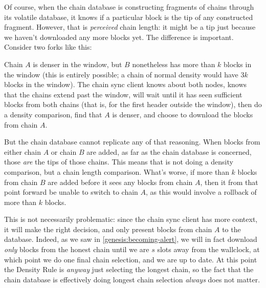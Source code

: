 Of course, when the chain database is constructing fragments of chains through
its volatile database, it knows if a particular block is the tip of any
constructed fragment. However, that is \emph{perceived} chain length: it might
be a tip just because we haven't downloaded any more blocks yet. The difference
is important. Consider two forks like this:
%
\begin{center}
\end{center}
%
Chain $A$ is denser in the window, but $B$ nonetheless has more than $k$ blocks
in the window (this is entirely possible; a chain of normal density would have
$3k$ blocks in the window).  The chain sync client knows about both nodes, knows
that the chains extend past the window, will wait until it has seen sufficient
blocks from both chains (that is, for the first header outside the window), then
do a density comparison, find that $A$ is denser, and choose to download the
blocks from chain $A$.

But the chain database cannot replicate any of that reasoning. When blocks  from
either chain $A$ or chain $B$ are added, as far as the chain database is
concerned, those \emph{are} the tips of those chains. This means that is not
doing a density comparison, but a chain length comparison. What's worse, if more
than $k$ blocks from chain $B$ are added before it sees any blocks from chain
$A$, then it from that point forward be unable to switch to chain $A$, as this
would involve a rollback of more than $k$ blocks.

This is not necessarily problematic: since the chain sync client has more
context, it will make the right decision, and only present blocks from chain $A$
to the database. Indeed, as we saw in \cref{genesis:becoming-alert}, we will
in fact download \emph{only} blocks from the honest chain until we are $s$
slots away from the wallclock, at which point we do one final chain selection,
and we are up to date. At this point the Density Rule is \emph{anyway} just
selecting the longest chain, so the fact that the chain database is effectively
doing longest chain selection \emph{always} does not matter.

